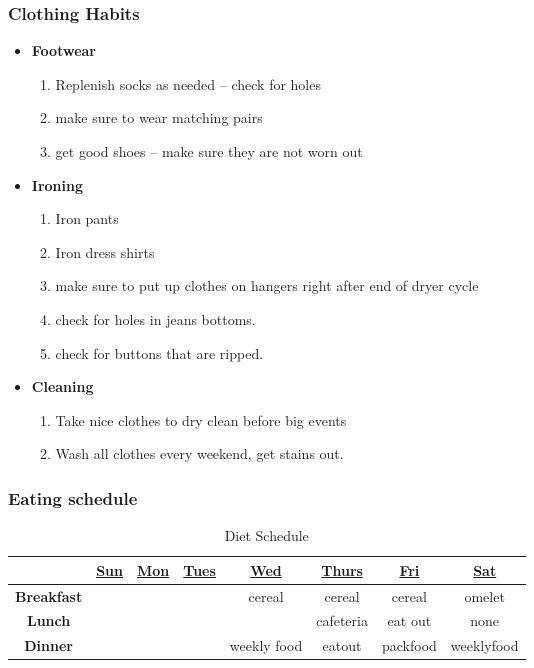 \begin{frame}
\frametitle{Clothing Habits}
\begin{itemize}
\item \textbf{Footwear}
\begin{enumerate}
\item \tiny Replenish socks as needed -- check for holes
\item \tiny make sure to wear matching pairs
\item \tiny get good shoes -- make sure they are not worn out
\end{enumerate}
\item \textbf{Ironing}
\begin{enumerate}
\item \tiny Iron pants
\item \tiny Iron dress shirts
\item \tiny make sure to put up clothes on hangers right after end of dryer cycle
\item \tiny check for holes in jeans bottoms.
\item \tiny check for buttons that are ripped.
\end{enumerate}
\item \textbf{Cleaning}
\begin{enumerate}
\item \tiny Take nice clothes to dry clean before big events
\item \tiny Wash all clothes every weekend, get stains out.
\end{enumerate}
\end{itemize}
\end{frame}

\begin{frame}
\frametitle{Eating schedule}
\begin{table}[h!]
  \begin{center}
    \begin{tabular}{ | c | c c c c c c c |}
    \hline
    & \underline{Sun} & \underline{Mon} & \underline{Tues} & \underline{Wed} & \underline{Thurs} & \underline{Fri} & \underline{Sat} \\
    \hline
    \tiny \textbf{Breakfast}  &  \tiny   & \tiny  & \tiny  & \tiny cereal & \tiny cereal & \tiny cereal & \tiny omelet \\
    \tiny \textbf{Lunch} & \tiny   & \tiny  & \tiny   & \tiny   & \tiny cafeteria & \tiny eat out  & \tiny none \\
    \tiny \textbf{Dinner} & \tiny & \tiny  & \tiny & \tiny weekly food & \tiny eatout & \tiny packfood & \tiny weeklyfood \\
    \hline
    \end{tabular}
  \end{center}
  \caption{Diet Schedule}
\end{table}
\end{frame}

